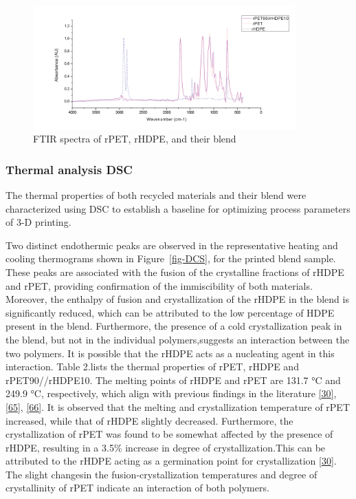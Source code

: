\documentclass[
]{article}
\begin{document}
\begin{figure}

{\centering \includegraphics[width=0.9\textwidth,height=\textheight]{figures/Figure_7_FTIR.png}

}

\caption{\label{fig-FTIR}FTIR spectra of rPET, rHDPE, and their blend}

\end{figure}

\hypertarget{thermal-analysis-dsc}{%
\subsubsection{Thermal analysis DSC}\label{thermal-analysis-dsc}}

The thermal properties of both recycled materials and their blend were
characterized using DSC to establish a baseline for optimizing process
parameters of 3-D printing.

Two distinct endothermic peaks are observed in the representative
heating and cooling thermograms shown in Figure~\ref{fig-DCS}, for the
printed blend sample. These peaks are associated with the fusion of the
crystalline fractions of rHDPE and rPET, providing confirmation of the
immiscibility of both materials. Moreover, the enthalpy of fusion and
crystallization of the rHDPE in the blend is significantly reduced,
which can be attributed to the low percentage of HDPE present in the
blend. Furthermore, the presence of a cold crystallization peak in the
blend, but not in the individual polymers,suggests an interaction
between the two polymers. It is possible that the rHDPE acts as a
nucleating agent in this interaction. Table 2.lists the thermal
properties of rPET, rHDPE and rPET90//rHDPE10. The melting points of
rHDPE and rPET are 131.7 °C and 249.9 °C, respectively, which align with
previous findings in the literature
\protect\hyperlink{ref-vaucher2022}{{[}30{]}},
\protect\hyperlink{ref-lei2009}{{[}65{]}},
\protect\hyperlink{ref-chen2015}{{[}66{]}}. It is observed that the
melting and crystallization temperature of rPET increased, while that of
rHDPE slightly decreased. Furthermore, the crystallization of rPET was
found to be somewhat affected by the presence of rHDPE, resulting in a
3.5\% increase in degree of crystallization.This can be attributed to
the rHDPE acting as a germination point for crystallization
\protect\hyperlink{ref-vaucher2022}{{[}30{]}}. The slight changesin the
fusion-crystallization temperatures and degree of crystallinity of rPET
indicate an interaction of both polymers.
\end{document}
